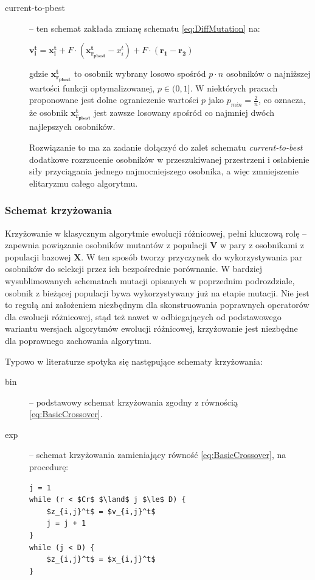 \documentclass[12pt,a4paper]{report}
\begin{document}
{{{{\begin{description}
\item[current-to-pbest] \cite{JADE} -- ten schemat zakłada zmianę schematu \ref{eq:DiffMutation} na:

\begin{center}
 $\mathbf{v_i^{t}} = \mathbf{x_i^t} + F \cdot (\mathbf{x_{r_{pbest}}^t} - x_i^t) + F \cdot (\mathbf{r_1} - \mathbf{r_{2}})$
\end{center}
gdzie $\mathbf{x_{r_{pbest}}^t}$ to osobnik wybrany losowo spośród $p \cdot n$ osobników o najniższej wartości funkcji optymalizowanej, $p \in (0,1]$. W niektórych pracach \cite{SHADE} proponowane jest dolne ograniczenie wartości $p$ jako $p_{min} = \frac{2}{n}$, co oznacza, że osobnik $\mathbf{x_{r_{pbest}}^t}$ jest zawsze losowany spośród co najmniej dwóch najlepszych osobników.

Rozwiązanie to ma za zadanie dołączyć do zalet schematu \emph{current-to-best} dodatkowe rozrzucenie osobników w przeszukiwanej przestrzeni i osłabienie siły przyciągania jednego najmocniejszego osobnika, a więc zmniejszenie elitaryzmu całego algorytmu.




\end{description}
}
\subsubsection{Schemat krzyżowania}
\par{
Krzyżowanie w klasycznym algorytmie ewolucji różnicowej, pełni kluczową rolę -- zapewnia powiązanie osobników mutantów z populacji $\mathbf{V}$ w pary z osobnikami z populacji bazowej $\mathbf{X}$. W ten sposób tworzy przyczynek do wykorzystywania par osobników do selekcji przez ich bezpośrednie porównanie. W bardziej wysublimowanych schematach mutacji opisanych w poprzednim podrozdziale, osobnik z bieżącej populacji bywa wykorzystywany już na etapie mutacji. Nie jest to regułą ani założeniem niezbędnym dla skonstruowania poprawnych operatorów dla ewolucji różnicowej, stąd też nawet w odbiegających od podstawowego wariantu wersjach algorytmów ewolucji różnicowej, krzyżowanie jest niezbędne dla poprawnego zachowania algorytmu.
}

\par{
Typowo w literaturze spotyka się następujące schematy krzyżowania:
\begin{description}
\item[bin] -- podstawowy schemat krzyżowania zgodny z równością \ref{eq:BasicCrossover}.
\item[exp] -- schemat krzyżowania zamieniający równość \ref{eq:BasicCrossover}, na procedurę:
\lstset{language=C}
\begin{lstlisting}[frame=single,mathescape]
j = 1
while (r < $Cr$ $\land$ j $\le$ D) {
	$z_{i,j}^t$ = $v_{i,j}^t$
	j = j + 1
}
while (j < D) {
	$z_{i,j}^t$ = $x_{i,j}^t$
}
\end{lstlisting}
\end{description}
}
}}}
\end{document}

